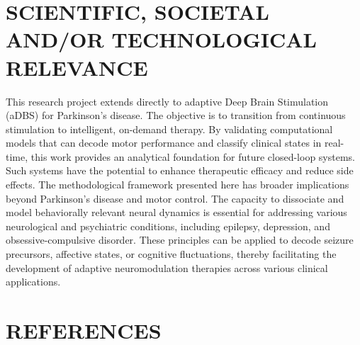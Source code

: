 \documentclass[12pt, a4paper]{article}
\begin{document}
\newpage

\section{SCIENTIFIC, SOCIETAL AND/OR TECHNOLOGICAL RELEVANCE}

This research project extends directly to adaptive Deep Brain Stimulation (aDBS) for Parkinson's disease. The objective is to transition from continuous stimulation to intelligent, on-demand therapy. By validating computational models that can decode motor performance and classify clinical states in real-time, this work provides an analytical foundation for future closed-loop systems. Such systems have the potential to enhance therapeutic efficacy and reduce side effects. The methodological framework presented here has broader implications beyond Parkinson's disease and motor control. The capacity to dissociate and model behaviorally relevant neural dynamics is essential for addressing various neurological and psychiatric conditions, including epilepsy, depression, and obsessive-compulsive disorder. These principles can be applied to decode seizure precursors, affective states, or cognitive fluctuations, thereby facilitating the development of adaptive neuromodulation therapies across various clinical applications.
\section{REFERENCES}
\printbibliography[heading=none]
\end{document}
